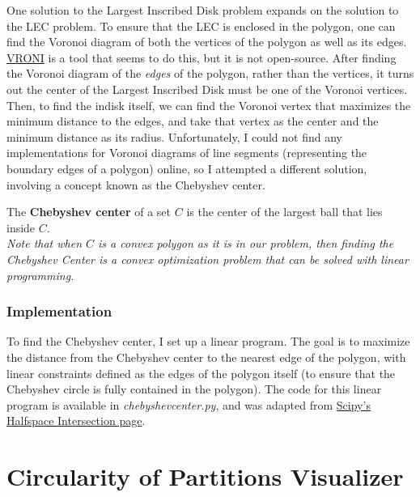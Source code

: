 \documentclass[11pt]{article}
\begin{document}
One solution to the Largest Inscribed Disk problem expands on the solution to the LEC problem. To ensure that the LEC is enclosed in the polygon, one can find the Voronoi diagram
of both the vertices of the polygon as well as its edges. \href{https://www.cosy.sbg.ac.at/~held/projects/vroni/vroni.html}{VRONI} is a tool that seems to do this, but it is not open-source.
After finding the Voronoi diagram of the \textit{edges} of the polygon, rather than the vertices, it turns out the center of the Largest Inscribed Disk must be one of the Voronoi vertices. Then,
to find the indisk itself, we can find the Voronoi vertex that maximizes the minimum distance to the edges, and take that vertex as the center and the minimum distance as its radius. Unfortunately, I could not find
any implementations for Voronoi diagrams of line segments (representing the boundary edges of a polygon) online, so I attempted a different solution, involving
a concept known as the Chebyshev center. \\

\begin{definition}
The \textbf{Chebyshev center} of a set $C$ is the center of the largest ball that lies inside $C$. \\

\textit{Note that when $C$ is a convex polygon as it is in our problem, then finding the Chebyshev Center is a convex optimization problem that can be solved with linear programming.}

\end{definition}



\subsubsection{Implementation}
To find the Chebyshev center, I set up a linear program. The goal is to maximize the distance from the Chebyshev center to the nearest edge of the polygon, with linear constraints
defined as the edges of the polygon itself (to ensure that the Chebyshev circle is fully contained in the polygon). The code for this linear program is available in \textit{chebyshevcenter.py}, and was adapted
from \href{https://docs.scipy.org/doc/scipy/reference/generated/scipy.spatial.HalfspaceIntersection.html}{Scipy's Halfspace Intersection page}.


\section{Circularity of Partitions Visualizer}
\end{document}
